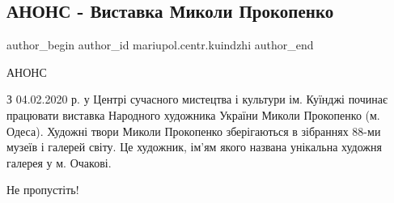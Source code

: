  
 
 
 
 

\subsection{АНОНС - Виставка Миколи Прокопенко}
\label{sec:31_01_2020.fb.mariupol.centr.kuindzhi.1.anons_vystavka_mykoly_prokopenko_m_odesa}

\ifcmt
 author_begin
   author_id mariupol.centr.kuindzhi
 author_end
\fi

АНОНС

З 04.02.2020 р. у Центрі сучасного мистецтва і культури ім. Куїнджі починає
працювати виставка Народного художника України Миколи Прокопенко (м. Одеса).
Художні твори Миколи Прокопенко зберігаються в зібраннях 88-ми музеїв і галерей
світу. Це художник, ім'ям якого названа унікальна художня галерея у м. Очакові.

Не пропустіть!
